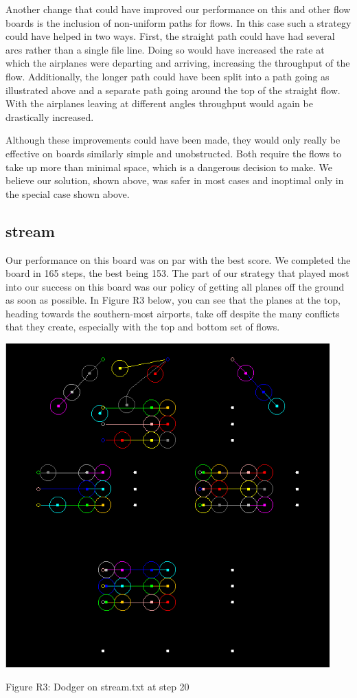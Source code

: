 \documentclass[10pt]{article}
\begin{document}
Another change that could have improved our performance on this and other flow boards is the inclusion of non-uniform paths for flows. In this case such a strategy could have helped in two ways. First, the straight path could have had several arcs rather than a single file line. Doing so would have increased the rate at which the airplanes were departing and arriving, increasing the throughput of the flow. Additionally, the longer path could have been split into a path going as illustrated above and a separate path going around the top of the straight flow. With the airplanes leaving at different angles throughput would again be drastically increased.

Although these improvements could have been made, they would only really be effective on boards similarly simple and unobstructed. Both require the flows to take up more than minimal space, which is a dangerous decision to make. We believe our solution, shown above, was safer in most cases and inoptimal only in the special case shown above.

\subsection{stream}

Our performance on this board was on par with the best score. We completed the board in 165 steps, the best being 153. The part of our strategy that played most into our success on this board was our policy of getting all planes off the ground as soon as possible. In Figure R3 below, you can see that the planes at the top, heading towards the southern-most airports, take off despite the many conflicts that they create, especially with the top and bottom set of flows.

\includegraphics[width=125mm]{pics/R3.png}
\caption{Figure R3: Dodger on stream.txt at step 20}
\end{document}
